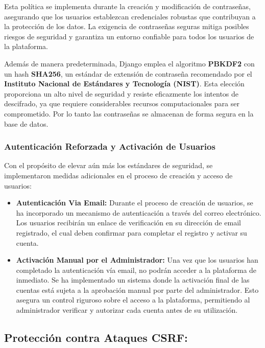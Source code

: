 Esta política se implementa durante la creación y modificación de contraseñas, asegurando que los usuarios establezcan credenciales robustas que contribuyan a la protección de los datos. La exigencia de contraseñas seguras mitiga posibles riesgos de seguridad y garantiza un entorno confiable para todos los usuarios de la plataforma.

Además de manera predeterminada, Django emplea el algoritmo \textbf{PBKDF2} con un hash \textbf{SHA256}, un estándar de extensión de contraseña recomendado por el \textbf{Instituto Nacional de Estándares y Tecnología (NIST)}. Esta elección proporciona un alto nivel de seguridad y resiste eficazmente los intentos de descifrado, ya que requiere considerables recursos computacionales para ser comprometido. Por lo tanto las contraseñas se almacenan de forma segura en la base de datos.

\subsubsection{Autenticación Reforzada y Activación de Usuarios}

Con el propósito de elevar aún más los estándares de seguridad, se implementaron medidas adicionales en el proceso de creación y acceso de usuarios:

\begin{itemize}
    \item \textbf{Autenticación Via Email:} Durante el proceso de creación de usuarios, se ha incorporado un mecanismo de autenticación a través del correo electrónico. Los usuarios recibirán un enlace de verificación en su dirección de email registrado, el cual deben confirmar para completar el registro y activar su cuenta.

    \item \textbf{Activación Manual por el Administrador:} Una vez que los usuarios han completado la autenticación vía email, no podrán acceder a la plataforma de inmediato. Se ha implementado un sistema donde la activación final de las cuentas está sujeta a la aprobación manual por parte del administrador. Esto asegura un control riguroso sobre el acceso a la plataforma, permitiendo al administrador verificar y autorizar cada cuenta antes de su utilización.
\end{itemize}


\subsection{Protección contra Ataques CSRF:}

